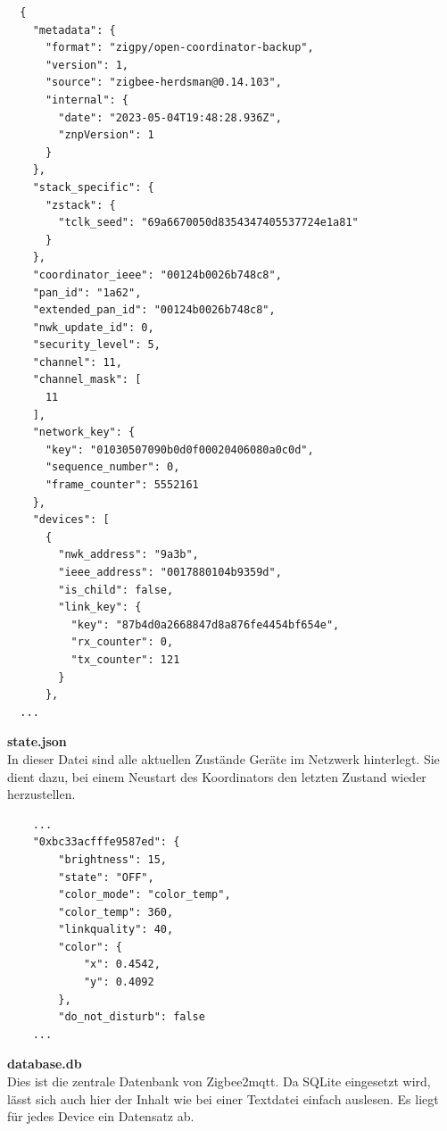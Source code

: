 \begin{lstlisting}
  {
    "metadata": {
      "format": "zigpy/open-coordinator-backup",
      "version": 1,
      "source": "zigbee-herdsman@0.14.103",
      "internal": {
        "date": "2023-05-04T19:48:28.936Z",
        "znpVersion": 1
      }
    },
    "stack_specific": {
      "zstack": {
        "tclk_seed": "69a6670050d8354347405537724e1a81"
      }
    },
    "coordinator_ieee": "00124b0026b748c8",
    "pan_id": "1a62",
    "extended_pan_id": "00124b0026b748c8",
    "nwk_update_id": 0,
    "security_level": 5,
    "channel": 11,
    "channel_mask": [
      11
    ],
    "network_key": {
      "key": "01030507090b0d0f00020406080a0c0d",
      "sequence_number": 0,
      "frame_counter": 5552161
    },
    "devices": [
      {
        "nwk_address": "9a3b",
        "ieee_address": "0017880104b9359d",
        "is_child": false,
        "link_key": {
          "key": "87b4d0a2668847d8a876fe4454bf654e",
          "rx_counter": 0,
          "tx_counter": 121
        }
      },
  ...  
  \end{lstlisting}

  \textbf{state.json}\\

  In dieser Datei sind alle aktuellen Zustände Geräte im Netzwerk hinterlegt. Sie dient dazu, bei einem Neustart des Koordinators den letzten Zustand wieder herzustellen.

  \begin{lstlisting}
    ...
    "0xbc33acfffe9587ed": {
        "brightness": 15,
        "state": "OFF",
        "color_mode": "color_temp",
        "color_temp": 360,
        "linkquality": 40,
        "color": {
            "x": 0.4542,
            "y": 0.4092
        },
        "do_not_disturb": false
    ...
  \end{lstlisting}
  \textbf{database.db}\\

  Dies ist die zentrale Datenbank von Zigbee2mqtt. Da SQLite eingesetzt wird, lässt sich auch hier der Inhalt wie bei einer Textdatei einfach auslesen.
  Es liegt für jedes Device ein Datensatz ab.

